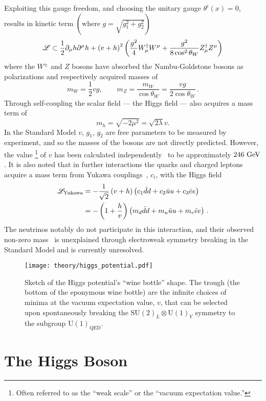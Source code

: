 Exploiting this gauge freedom, and choosing the unitary gauge $\theta^{i}(x)=0$, results in kinetic term $\left(\textrm{where } g = \sqrt{g_{1}^{2} + g_{2}^{2}}\right)$
\[
 \mathscr{L} \subset \frac{1}{2}\partial_{\mu} h \partial^{\mu} h + \left(v + h\right)^{2} \left(\frac{g^{2}}{4} W_{\mu}^{\dagger}W^{\mu} + \frac{g^{2}}{8 \cos^2 \theta_{W}} Z_{\mu}^{\dagger}Z^{\mu}\right)
\]
where the $W^{\pm}$ and $Z$ bosons have absorbed the Nambu-Goldstone bosons as polarizations and respectively acquired masses of
\[
 m_{W} = \frac{1}{2}vg, \qquad m_{Z} = \frac{m_{W}}{\cos\theta_{W}} = \frac{vg}{2\cos\theta_{W}}\,.
\]
Through self-coupling the scalar field --- the Higgs field --- also acquires a mass term of
\[
 m_{h} = \sqrt{-2\mu^{2}} = \sqrt{2\lambda}v.
\]
In the Standard Model $v$, $g_{1}$, $g_{2}$ are free parameters to be measured by experiment, and so the masses of the bosons are not directly predicted.
However, the value%
\footnote{Often referred to as the ``weak scale'' or the ``vacuum expectation value.''}
of $v$ has been calculated independently~\cite{Plehn:2005nk} to be approximately $246~\mathrm{GeV}$.
It is also noted that in further interactions the quarks and charged leptons acquire a mass term from Yukawa couplings~\cite{Yukawa:1935xg}, $c_i$, with the Higgs field
\[
 \begin{split}
  \mathscr{L}_{\textrm{Yukawa}} &= -\frac{1}{\sqrt{2}} \left(v+h\right) \left(c_{1}\bar{d}d + c_{2}\bar{u}u + c_{3}\bar{e}e\right) \\
  &= - \left(1 + \frac{h}{v}\right)\left(m_{d}\bar{d}d + m_{u}\bar{u}u + m_{e}\bar{e}e\right)\,.
 \end{split}
\]
The neutrinos notably do not participate in this interaction, and their observed non-zero mass~\cite{Ahmad:2001an} is unexplained through electroweak symmetry breaking in the Standard Model and is currently unresolved.

\begin{figure}[htbp]
 \centering
 \texttt{[image: theory/higgs\_potential.pdf]}
 \caption[Sketch of the Higgs potential shape.]{%
 Sketch of the Higgs potential's ``wine bottle'' shape.
 The trough (the bottom of the eponymous wine bottle) are the infinite choices of minima at the vacuum expectation value, $v$, that can be selected upon spontaneously breaking the $\mathrm{SU}(2)_{L} \otimes \mathrm{U}(1)_{Y}$ symmetry to the subgroup $\mathrm{U}(1)_{\textrm{QED}}$.}
 \label{fig:Higgs_potential}
\end{figure}

\section{The Higgs Boson}\label{section:Higgs_boson}

